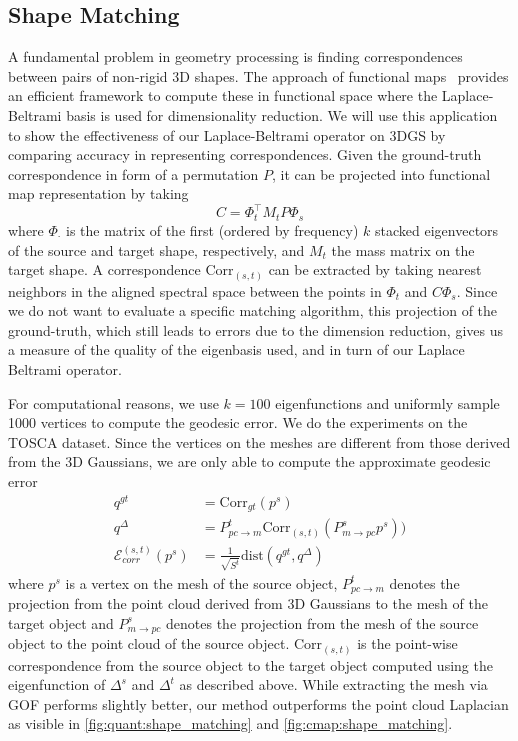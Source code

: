 \subsection{Shape Matching}\label{sub:exp:matching}
A fundamental problem in geometry processing is finding correspondences between pairs of non-rigid 3D shapes. 
The approach of functional maps~\cite{ovsjanikov2012functional} provides an efficient framework to compute these in functional space where the Laplace-Beltrami basis is used for dimensionality reduction. 
We will use this application to show the effectiveness of our Laplace-Beltrami operator on 3DGS by comparing accuracy in representing correspondences.
Given the ground-truth correspondence in form of a permutation $P$, it can be projected into functional map representation by taking
\begin{equation}
    C = \Phi_t^\top M_t P \Phi_s
\end{equation}
where $\Phi_\cdot$ is the matrix of the first (ordered by frequency) $k$ stacked eigenvectors of the source and target shape, respectively, and $M_t$ the mass matrix on the target shape. 
A correspondence $\text{Corr}_{(s, t)}$ can be extracted by taking nearest neighbors in the aligned spectral space between the points in $\Phi_t$ and $C\Phi_s$.
Since we do not want to evaluate a specific matching algorithm, this projection of the ground-truth, which still leads to errors due to the dimension reduction, gives us a measure of the quality of the eigenbasis used, and in turn of our Laplace Beltrami operator.

For computational reasons, we use $k=100$ eigenfunctions and uniformly sample 1000 vertices to compute the geodesic error. 
We do the experiments on the TOSCA dataset.  
Since the vertices on the meshes are different from those derived from the 3D Gaussians, we are only able to compute the approximate geodesic error
\[
\begin{array}{rl}
    q^{gt} &= \text{Corr}_{gt}(p^s) \\[0.3em]
    q^{\Delta} &= P_{pc \to m}^t\text{Corr}_{(s, t)}(P_{m\to pc}^s p^s)) \\[0.3em]
    \mathcal{E}_{corr}^{(s, t)}(p^s) &= \frac{1}{\sqrt{S^t}}\text{dist}(q^{gt}, q^{\Delta})
\end{array}
\] %
where $p^s$ is a vertex on the mesh of the source object, $P_{pc\to m}^t$ denotes the projection from the point cloud derived from 3D Gaussians to the mesh of the target object and $P_{m\to pc}^s$ denotes the projection from the mesh of the source object to the point cloud of the source object. $\text{Corr}_{(s, t)}$ is the point-wise correspondence from the source object to the target object computed using the eigenfunction of $\Delta^s$ and $\Delta^t$ \cite{ovsjanikov2012functional} as described above.
While extracting the mesh via GOF performs slightly better, our method outperforms the point cloud Laplacian as visible in \cref{fig:quant:shape_matching} and \cref{fig:cmap:shape_matching}.

